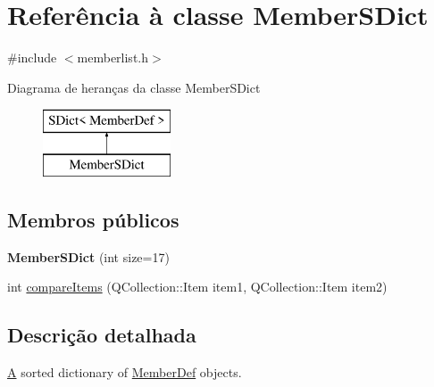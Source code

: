 \hypertarget{class_member_s_dict}{\section{Referência à classe Member\-S\-Dict}
\label{class_member_s_dict}
}


{\ttfamily \#include $<$memberlist.\-h$>$}

Diagrama de heranças da classe Member\-S\-Dict\begin{figure}[H]
\begin{center}
\leavevmode
\includegraphics[height=2.000000cm]{class_member_s_dict}
\end{center}
\end{figure}
\subsection*{Membros públicos}
\begin{DoxyCompactItemize}
\item 
\hypertarget{class_member_s_dict_a0f454f7ec343700d111e7ebf560fd4b7}{{\bfseries Member\-S\-Dict} (int size=17)}\label{class_member_s_dict_a0f454f7ec343700d111e7ebf560fd4b7}

\item 
int \hyperlink{class_member_s_dict_a219450accf048597ffc7113ecde4c402}{compare\-Items} (Q\-Collection\-::\-Item item1, Q\-Collection\-::\-Item item2)
\end{DoxyCompactItemize}


\subsection{Descrição detalhada}
\hyperlink{class_a}{A} sorted dictionary of \hyperlink{class_member_def}{Member\-Def} objects. 

